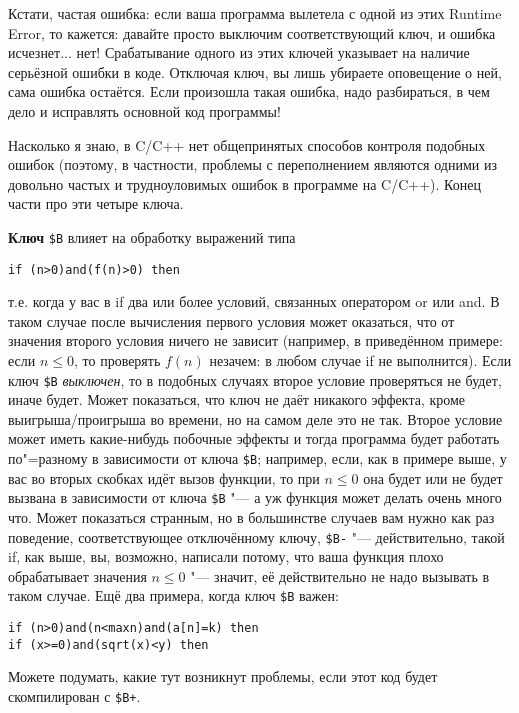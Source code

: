 Кстати, частая ошибка: если ваша программа вылетела с одной из этих Runtime Error, то кажется: 
давайте просто выключим соответствующий ключ, и ошибка исчезнет... нет! Срабатывание одного из этих 
ключей указывает на наличие серьёзной ошибки в коде. Отключая ключ, вы лишь убираете оповещение о 
ней, сама ошибка остаётся. Если произошла такая ошибка, надо разбираться, в чем дело и исправлять 
основной код программы!

Насколько я знаю, в C/C++ нет общепринятых способов контроля подобных ошибок (поэтому, в частности, 
проблемы с переполнением являются одними из довольно частых и трудноуловимых ошибок в программе на 
C/C++). Конец части про эти четыре ключа.

\textbf{Ключ} \verb|$B| влияет на обработку выражений типа
\begin{codesampleo}\begin{verbatim}
if (n>0)and(f(n)>0) then
\end{verbatim}
\end{codesampleo}
т.е. когда у вас в if два или более условий, связанных оператором or или and. В таком случае после 
вычисления первого условия может оказаться, что от значения второго условия ничего не зависит 
(например, в приведённом примере: если $n\leq0$, то проверять $f(n)$ незачем: в любом случае if не 
выполнится). Если ключ \verb|$B| \textit{выключен}, то в подобных случаях второе условие 
проверяться не будет, иначе будет. Может показаться, что ключ не даёт никакого эффекта, кроме 
выигрыша/проигрыша во времени, но на самом деле это не так. Второе условие может иметь какие-нибудь 
побочные эффекты и тогда программа будет работать по"=разному в зависимости от ключа \verb|$B|; 
например, если, как в примере выше, у вас во вторых скобках идёт вызов функции, то при $n\leq0$ она 
будет или не будет вызвана в зависимости от ключа \verb|$B| "--- а уж функция может делать очень 
много что. Может показаться странным, но в большинстве случаев вам нужно как раз поведение, 
соответствующее отключённому ключу, \verb|$B-| "--- действительно, такой if, как выше, вы, 
возможно, написали потому, что ваша функция плохо обрабатывает значения $n\leq0$ "--- значит, её 
действительно не надо вызывать в таком случае. Ещё два примера, когда ключ \verb|$B| важен:
\begin{codesample}\begin{verbatim}
if (n>0)and(n<maxn)and(a[n]=k) then
if (x>=0)and(sqrt(x)<y) then
\end{verbatim}
\end{codesample}
Можете подумать, какие тут возникнут проблемы, если этот код будет скомпилирован с \verb|$B+|.

